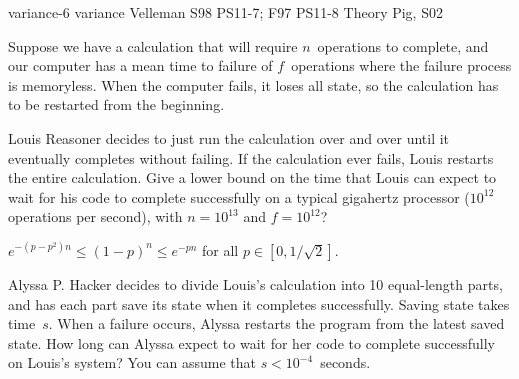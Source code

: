         \problemdata       %
        {variance-6}             %
        {variance}               %
        {Velleman}               %
        {S98 PS11-7; F97 PS11-8} %
        {Theory Pig, S02}        %
\begin{problem}

Suppose we have a calculation that will require $n$~operations to
complete, and our computer has a mean time to failure of
$f$~operations where the failure process is memoryless.  When the
computer fails, it loses all state, so the calculation has to be
restarted from the beginning.

\begin{problemparts}

\problempart Louis Reasoner decides to just run the calculation over and
over until it eventually completes without failing. If the calculation
ever fails, Louis restarts the entire calculation. Give a lower bound
on the time that Louis can expect to wait for his code to complete
successfully on a typical gigahertz processor ($10^{12}$ operations per
second), with $n = 10^{13}$ and 
$f = 10^{12}$? 

\hint $e^{-(p-p^2)n}\leq (1-p)^n \leq e^{-pn}$ for all $p \in [0,1/\sqrt{2}]$.


\problempart Alyssa P. Hacker decides to divide Louis's calculation into
10 equal-length parts, and has each part save its state when it
completes successfully. Saving state takes time~$s$. When a failure
occurs, Alyssa restarts the program from the latest saved state. How
long can Alyssa expect to wait for her code to complete successfully
on Louis's system? You can assume that $s < 10^{-4}$~seconds.


\end{problemparts}
\end{problem}
